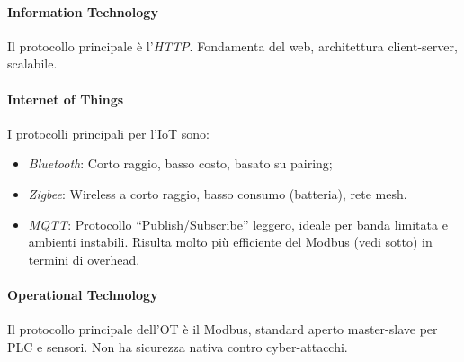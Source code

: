 %
\paragraph{Information Technology} Il protocollo principale è l'\emph{HTTP}. Fondamenta del web, architettura client-server, scalabile.
%
\paragraph{Internet of Things} I protocolli principali per l'IoT sono:
\begin{itemize}
    \item \emph{Bluetooth}: Corto raggio, basso costo, basato su pairing;
    \item \emph{Zigbee}: Wireless a corto raggio, basso consumo (batteria), rete mesh.
    \item \emph{MQTT}: Protocollo ``Publish/Subscribe'' leggero, ideale per banda limitata e ambienti instabili. Risulta molto più efficiente del Modbus (vedi sotto) in termini di overhead.
\end{itemize}
%
\paragraph{Operational Technology} Il protocollo principale dell'OT è il Modbus, standard aperto master-slave per PLC e sensori. Non ha sicurezza nativa contro cyber-attacchi.